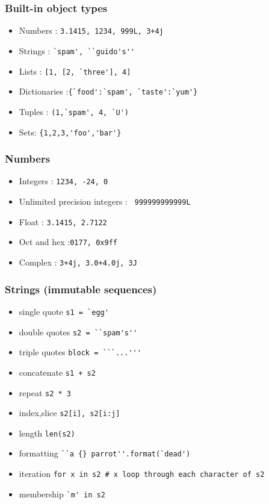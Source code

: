\begin{frame}[fragile]\frametitle{Built-in object types}
  \begin{itemize}
  \item Numbers : \lstinline{3.1415, 1234, 999L, 3+4j}
  \item Strings : \lstinline{`spam', ``guido's''}
  \item Lists : \lstinline{[1, [2, `three'], 4]}
   \item Dictionaries :\lstinline|{`food':`spam', `taste':`yum'}|
  \item Tuples : \lstinline{(1,`spam', 4, `U')}
  \item Sets: \lstinline|{1,2,3,'foo','bar'}|
  \end{itemize}
\end{frame}

\begin{frame}[fragile]\frametitle{Numbers}
  \begin{itemize}
  \item Integers : \lstinline{1234, -24, 0}
  \item Unlimited precision integers : \lstinline{ 999999999999L}
  \item Float : \lstinline{3.1415, 2.7122}
   \item Oct and hex :\lstinline|0177, 0x9ff|
  \item Complex : \lstinline{3+4j, 3.0+4.0j, 3J}
  \end{itemize}
\end{frame}

\begin{frame}[fragile]\frametitle{Strings (immutable sequences)}
  \begin{itemize}
  \item single quote \lstinline{s1 = `egg'}
\item double quotes \lstinline{s2 = ``spam's''}
\item triple quotes \lstinline{block = ```...'''}
\item concatenate \lstinline{s1 + s2}
\item repeat \lstinline{s2 * 3}
\item index,slice \lstinline{s2[i], s2[i:j]}
\item length \lstinline{len(s2)}
\item formatting \lstinline|``a {} parrot''.format(`dead')|
\item iteration \lstinline{for x in s2 # x loop through each character of s2}
\item membership \lstinline{`m' in s2}
  \end{itemize}
\end{frame}

